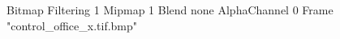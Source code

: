 {Bitmap
	{Filtering 1}
	{Mipmap 1}
	{Blend none}
	{AlphaChannel 0}
	{Frame "control_office_x.tif.bmp"}
}
